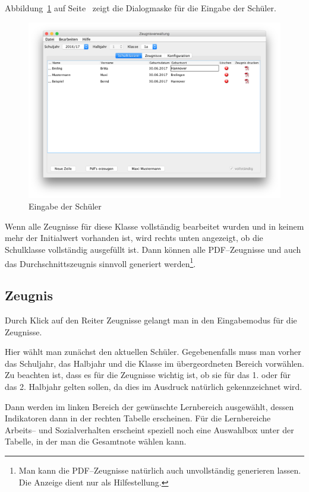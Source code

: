 \documentclass[a4paper,notitlepage,parskip]{scrartcl}
\newcommand\ott{\normalfont\ttfamily}
\begin{document}
Abbildung~\ref{fig:Schulklassen} auf Seite~\pageref{fig:Schulklassen} zeigt die Dialogmaske für die Eingabe der Schüler.

\begin{figure}[ht]
\centering
\centerline{\includegraphics[width=1.0\textwidth]{Schulklassen}}
\caption{Eingabe der Schüler}
\label{fig:Schulklassen}
\end{figure}

Wenn alle Zeugnisse für diese Klasse vollständig bearbeitet wurden und in keinem mehr der Initialwert vorhanden ist, wird rechts unten angezeigt, ob die Schulklasse vollständig ausgefüllt ist.
Dann können alle PDF--Zeugnisse und auch das Durchschnittszeugnis sinnvoll generiert werden\footnote{Man kann die PDF--Zeugnisse natürlich auch unvollständig generieren lassen. Die Anzeige dient nur als Hilfestellung.}.
\subsection{Zeugnis}
Durch Klick auf den Reiter {\ott Zeugnisse} gelangt man in den Eingabemodus für die Zeugnisse.

Hier wählt man zunächst den aktuellen Schüler.
Gegebenenfalls muss man vorher das Schuljahr, das Halbjahr und die Klasse im übergeordneten Bereich vorwählen.
Zu beachten ist, dass es für die Zeugnisse wichtig ist, ob sie für das 1. oder für das 2. Halbjahr gelten sollen, da dies im Ausdruck natürlich gekennzeichnet wird.

Dann werden im linken Bereich der gewünschte Lernbereich ausgewählt, dessen Indikatoren dann in der rechten Tabelle erscheinen.
Für die Lernbereiche Arbeits-- und Sozialverhalten erscheint speziell noch eine Auswahlbox unter der Tabelle, in der man die Gesamtnote wählen kann. 
\end{document}
